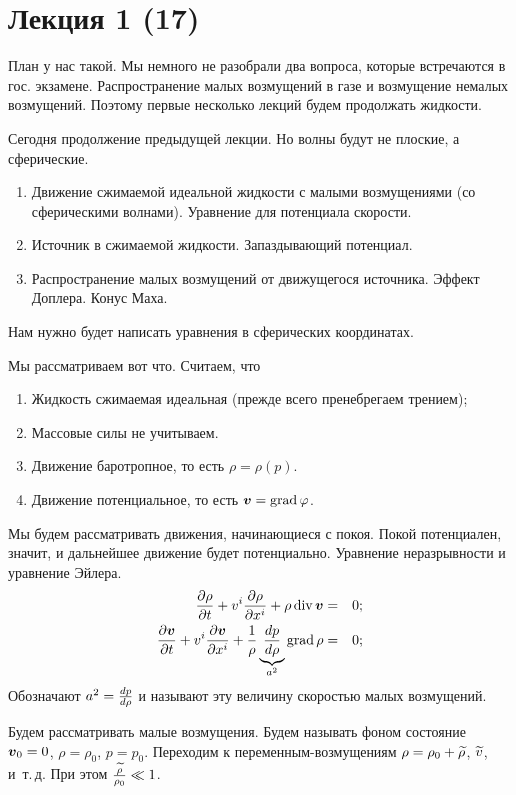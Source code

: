 \section{Лекция 1 (17)}
План у нас такой. Мы немного не разобрали два вопроса, которые встречаются в гос. экзамене. Распространение малых возмущений в газе и возмущение немалых возмущений. Поэтому первые несколько лекций будем продолжать жидкости.

Сегодня продолжение предыдущей лекции. Но волны будут не плоские, а сферические.

\begin{enumerate}
  \item Движение сжимаемой идеальной жидкости с малыми возмущениями (со сферическими волнами). Уравнение для потенциала скорости.
  \item Источник в сжимаемой жидкости. Запаздывающий потенциал.
  \item Распространение малых возмущений от движущегося источника. Эффект Доплера. Конус Маха.
\end{enumerate}

Нам нужно будет написать уравнения в сферических координатах.

Мы рассматриваем вот что. Считаем, что
\begin{enumerate}
\item Жидкость сжимаемая идеальная (прежде всего пренебрегаем трением);
\item Массовые силы не учитываем.
\item Движение баротропное, то есть $\rho = \rho(p)$.
\item Движение потенциальное, то есть $\boldsymbol{v} = \operatorname{grad}\varphi$.
\end{enumerate}

Мы будем рассматривать движения, начинающиеся с покоя. Покой потенциален, значит, и дальнейшее движение будет потенциально. Уравнение неразрывности и уравнение Эйлера.
\begin{eqnarray}
\frac{\partial \rho}{\partial t} + v^i\frac{\partial \rho}{\partial x^i} + \rho\operatorname{div} \boldsymbol{v} &=& 0;\\
\frac{\partial \boldsymbol{v}}{\partial t} + v^i\frac{\partial \boldsymbol{v}}{\partial x^i} + \frac1\rho \underbrace{\frac{dp}{d\rho}}_{a^2}\operatorname{grad}
\rho &=&0;
\end{eqnarray}
Обозначают  $a^2 = \frac{dp}{d\rho}$ и называют эту величину скоростью малых возмущений.

Будем рассматривать малые возмущения. Будем называть фоном состояние $\boldsymbol{v}_0 = 0$, $\rho = \rho_0$, $p=p_0$. Переходим к переменным-возмущениям $\rho = \rho_0+\widetilde{\rho}{}$, $\widetilde{v}{}$, и~т.\,д. При этом $\frac{\widetilde{\rho}{}}{\rho_0}\ll1$.

